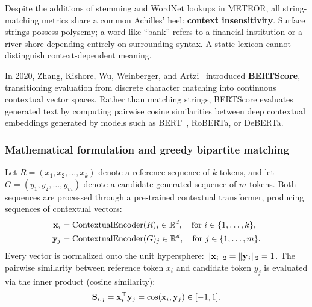 \documentclass[../../main.tex]{subfiles}
\begin{document}
Despite the additions of stemming and WordNet lookups in METEOR, all string-matching metrics share a common Achilles' heel: \textbf{context insensitivity}. Surface strings possess polysemy; a word like ``bank'' refers to a financial institution or a river shore depending entirely on surrounding syntax. A static lexicon cannot distinguish context-dependent meaning.

In 2020, Zhang, Kishore, Wu, Weinberger, and Artzi~\cite{zhang2020bertscore} introduced \textbf{BERTScore}, transitioning evaluation from discrete character matching into continuous contextual vector spaces. Rather than matching strings, BERTScore evaluates generated text by computing pairwise cosine similarities between deep contextual embeddings generated by models such as BERT~\cite{devlin2019}, RoBERTa, or DeBERTa.

\subsubsection{Mathematical formulation and greedy bipartite matching}
Let $R = (x_1, x_2, \dots, x_k)$ denote a reference sequence of $k$ tokens, and let $G = (y_1, y_2, \dots, y_m)$ denote a candidate generated sequence of $m$ tokens. Both sequences are processed through a pre-trained contextual transformer, producing sequences of contextual vectors:
\begin{align}
\mathbf{x}_i &= \text{ContextualEncoder}(R)_i \in \mathbb{R}^d, \quad \text{for } i \in \{1, \dots, k\}, \\
\mathbf{y}_j &= \text{ContextualEncoder}(G)_j \in \mathbb{R}^d, \quad \text{for } j \in \{1, \dots, m\}.
\end{align}
Every vector is normalized onto the unit hypersphere: $\lVert\mathbf{x}_i\rVert_2 = \lVert\mathbf{y}_j\rVert_2 = 1$. The pairwise similarity between reference token $x_i$ and candidate token $y_j$ is evaluated via the inner product (cosine similarity):
\begin{equation}
\label{eq:bertscore_pairwise_sim}
\mathbf{S}_{i, j} = \mathbf{x}_i^\top \mathbf{y}_j = \cos(\mathbf{x}_i, \mathbf{y}_j) \in [-1, 1].
\end{equation}
\end{document}
